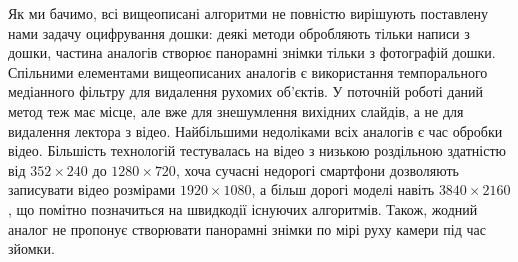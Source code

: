 \chapterConclusion

Як ми бачимо, всі вищеописані алгоритми не повністю вирішують поставлену нами задачу
оцифрування дошки: деякі методи обробляють тільки написи з дошки,
частина аналогів створює панорамні знімки тільки з фотографій дошки.
Спільними елементами вищеописаних аналогів є використання 
темпорального медіанного фільтру для видалення рухомих об'єктів.
У поточній роботі даний метод теж має місце, але вже для знешумлення
вихідних слайдів, а не для видалення лектора з відео.
Найбільшими недоліками всіх аналогів є час обробки відео.
Більшість технологій тестувалась на відео з низькою роздільною здатністю
від $352\times240$ до $1280\times720$,
хоча сучасні недорогі смартфони дозволяють записувати відео
розмірами $1920\times1080$, а більш дорогі моделі навіть $3840\times2160$,
що помітно позначиться на швидкодії існуючих алгоритмів.
Також, жодний аналог не пропонує створювати панорамні знімки по мірі руху камери під
час зйомки.
